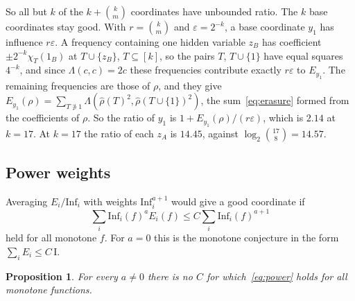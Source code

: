 \documentclass[11pt]{amsart}
\newtheorem{proposition}[theorem]{Proposition}
\theoremstyle{definition}
\theoremstyle{remark}
\newcommand{\Inf}{\mathrm{Inf}}
\begin{document}
So all but $k$ of the $k+\binom km$ coordinates have unbounded ratio. The $k$ base coordinates stay good. With
$r=\binom km$ and $\varepsilon=2^{-k}$, a base coordinate $y_1$ has influence $r\varepsilon$. A frequency containing one hidden
variable $z_B$ has coefficient $\pm2^{-k}\chi_T(1_B)$ at $T\cup\{z_B\}$, $T\subseteq[k]$, so the pairs $T$,
$T\cup\{1\}$ have equal squares $4^{-k}$, and since $\Lambda(c,c)=2c$ these frequencies contribute exactly $r\varepsilon$ to
$E_{y_1}$. The remaining frequencies are those of $\rho$, and they give
$E_{y_1}(\rho)=\sum_{T\not\ni1}\Lambda(\hat\rho(T)^2,\hat\rho(T\cup\{1\})^2)$, the sum~\eqref{eq:erasure} formed from
the coefficients of $\rho$. So the ratio of $y_1$ is $1+E_{y_1}(\rho)/(r\varepsilon)$, which is $2.14$ at $k=17$. At
$k=17$ the ratio of each $z_A$ is $14.45$, against $\log_2\binom{17}8=14.57$.

\subsection{Power weights}
Averaging $E_i/\Inf_i$ with weights $\Inf_i^{a+1}$ would give a good coordinate if
\begin{equation}\label{eq:power}
\sum_i\Inf_i(f)^aE_i(f)\le C\sum_i\Inf_i(f)^{a+1}
\end{equation}
held for all monotone $f$. For $a=0$ this is the monotone conjecture in the form $\sum_iE_i\le C\,\mathrm I$.

\begin{proposition}
For every $a\ne0$ there is no $C$ for which~\eqref{eq:power} holds for all monotone functions.
\end{proposition}
\end{document}
